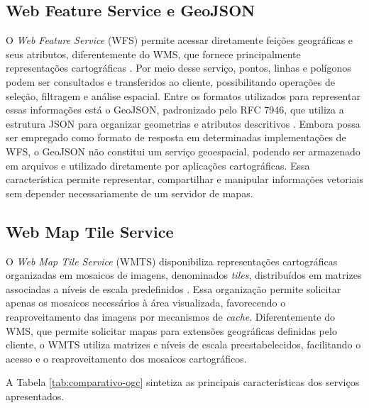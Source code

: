 \subsection{Web Feature Service e GeoJSON}
\label{sec:wfs}

O \textit{Web Feature Service} (WFS) permite acessar diretamente feições geográficas e seus atributos, diferentemente do \gls{WMS}, que fornece principalmente representações cartográficas \cite{OGCWFS}.  Por meio desse serviço, pontos, linhas e polígonos podem ser consultados e transferidos ao cliente, possibilitando operações de seleção, filtragem e análise espacial. Entre os formatos utilizados para representar essas informações está o GeoJSON, padronizado pelo RFC 7946, que utiliza a estrutura \gls{JSON} para organizar geometrias e atributos descritivos \cite{RFC7946}. Embora possa ser empregado como formato de resposta em determinadas implementações de \gls{WFS}, o GeoJSON não constitui um serviço geoespacial, podendo ser armazenado em arquivos e utilizado diretamente por aplicações cartográficas. Essa característica permite representar, compartilhar e manipular informações vetoriais sem depender necessariamente de um servidor de mapas.

\subsection{Web Map Tile Service}
\label{sec:wmts}

O \textit{Web Map Tile Service} (WMTS) disponibiliza representações cartográficas organizadas em mosaicos de imagens, denominados \textit{tiles}, distribuídos em matrizes associadas a níveis de escala predefinidos \cite{OGCWMTS}.  Essa organização permite solicitar apenas os mosaicos necessários à área visualizada, favorecendo o reaproveitamento das imagens por mecanismos de \textit{cache}. Diferentemente do \gls{WMS}, que permite solicitar mapas para extensões geográficas definidas pelo cliente, o \gls{WMTS} utiliza matrizes e níveis de escala preestabelecidos, facilitando o acesso e o reaproveitamento dos mosaicos cartográficos.

A Tabela \ref{tab:comparativo-ogc} sintetiza as principais características dos serviços apresentados.

